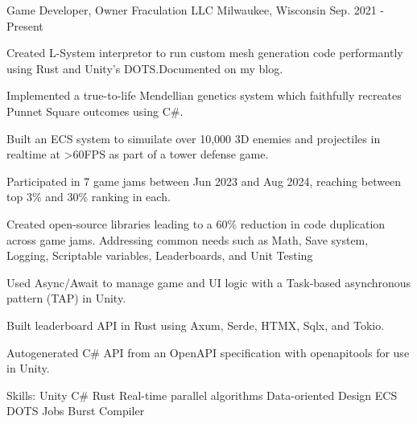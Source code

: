 \begin{cventries}
\cventry
{Game Developer, Owner} %
{Fraculation LLC} %
{Milwaukee, Wisconsin} %
{Sep. 2021 - Present} %
{
  \begin{cvitems} %
    \item {Created L-System interpretor to run custom mesh generation code performantly using Rust and Unity's DOTS.\@ Documented on my blog.}
    \item {Implemented a true-to-life Mendellian genetics system which faithfully recreates Punnet Square outcomes using C\#.}
    \item {Built an ECS system to simuilate over 10,000 3D enemies and projectiles in realtime at >60FPS as part of a tower defense game.}
    \item {Participated in 7 game jams between Jun 2023 and Aug 2024, reaching between top 3\% and 30\% ranking in each.}
    \item {Created open-source libraries leading to a 60\% reduction in code duplication across game jams. Addressing common needs such as Math, Save system, Logging, Scriptable variables, Leaderboards, and Unit Testing}
    \item {Used Async/Await to manage game and UI logic with a Task-based asynchronous pattern (TAP) in Unity.}
    \item {Built leaderboard API in Rust using Axum, Serde, HTMX, Sqlx, and Tokio.}
    \item {Autogenerated C\# API from an OpenAPI specification with openapitools for use in Unity.}
    \item {Skills: Unity \textbullet{} C\# \textbullet{} Rust \textbullet{} Real-time parallel algorithms \textbullet{} Data-oriented Design \textbullet{} ECS \textbullet{} DOTS \textbullet{} Jobs \textbullet{} Burst Compiler}
  \end{cvitems}
}


\end{cventries}
